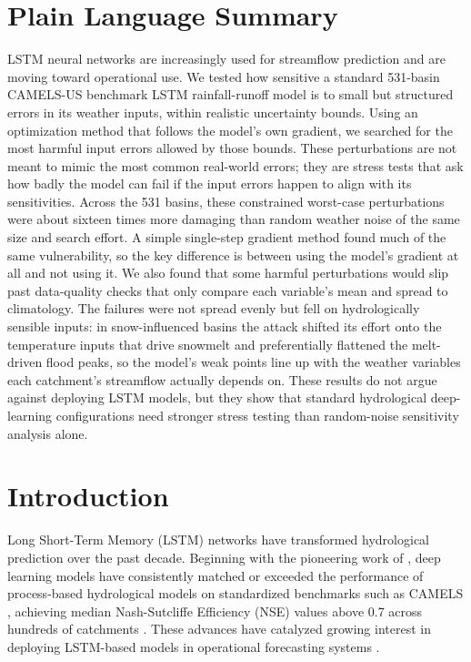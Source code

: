 \documentclass[final]{agujournal2019}
\begin{document}
\section*{Plain Language Summary}
LSTM neural networks are increasingly used for streamflow prediction and are moving toward operational use. We tested how sensitive a standard 531-basin CAMELS-US benchmark LSTM rainfall-runoff model is to small but structured errors in its weather inputs, within realistic uncertainty bounds. Using an optimization method that follows the model's own gradient, we searched for the most harmful input errors allowed by those bounds. These perturbations are not meant to mimic the most common real-world errors; they are stress tests that ask how badly the model can fail if the input errors happen to align with its sensitivities. Across the 531 basins, these constrained worst-case perturbations were about sixteen times more damaging than random weather noise of the same size and search effort. A simple single-step gradient method found much of the same vulnerability, so the key difference is between using the model's gradient at all and not using it. We also found that some harmful perturbations would slip past data-quality checks that only compare each variable's mean and spread to climatology. The failures were not spread evenly but fell on hydrologically sensible inputs: in snow-influenced basins the attack shifted its effort onto the temperature inputs that drive snowmelt and preferentially flattened the melt-driven flood peaks, so the model's weak points line up with the weather variables each catchment's streamflow actually depends on. These results do not argue against deploying LSTM models, but they show that standard hydrological deep-learning configurations need stronger stress testing than random-noise sensitivity analysis alone.

\section{Introduction}

Long Short-Term Memory (LSTM) networks have transformed hydrological prediction over the past decade. Beginning with the pioneering work of , deep learning models have consistently matched or exceeded the performance of process-based hydrological models on standardized benchmarks such as CAMELS \cite{Addor2017}, achieving median Nash-Sutcliffe Efficiency (NSE) values above 0.7 across hundreds of catchments \cite{Kratzert2019, Gauch2021}. These advances have catalyzed growing interest in deploying LSTM-based models in operational forecasting systems \cite{Nearing2021}.
\end{document}
